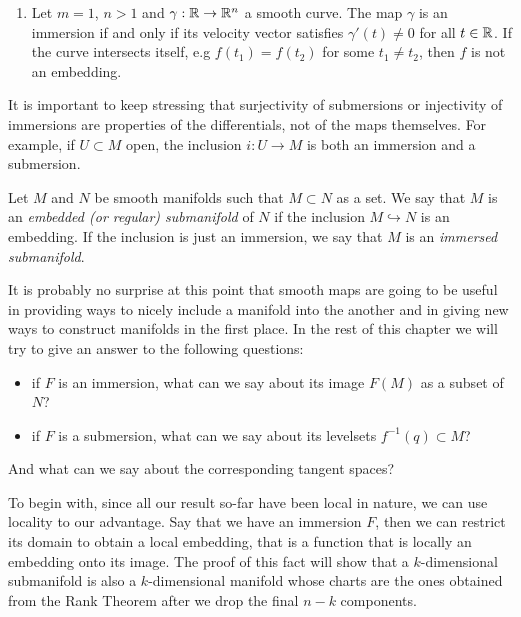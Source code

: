 \begin{example}
\begin{enumerate}
    \item Let $m=1$, $n > 1$ and $\gamma:\mathbb{R}\to\mathbb{R}^n$ a smooth curve.
          The map $\gamma$ is an immersion if and only if its velocity vector satisfies $\gamma'(t)\neq0$ for all $t\in\mathbb{R}$.
          If the curve intersects itself, e.g $f(t_1) = f(t_2)$ for some $t_1\neq t_2$, then $f$ is not an embedding.
  \end{enumerate}
\end{example}

\begin{remark}
  It is important to keep stressing that surjectivity of submersions or injectivity of immersions are properties of the differentials, not of the maps themselves.
  For example, if $U\subset M$ open, the inclusion $i: U \to M$ is both an immersion and a submersion.
\end{remark}

\begin{definition}
  Let $M$ and $N$ be smooth manifolds such that $M\subset N$ as a set.
  We say that $M$ is an \emph{embedded (or regular) submanifold} of $N$ if the inclusion $M\hookrightarrow N$ is an embedding. If the inclusion is just an immersion, we say that $M$ is an \emph{immersed submanifold}.
\end{definition}

It is probably no surprise at this point that smooth maps are going to be useful in providing ways to nicely include a manifold into the another and in giving new ways to construct manifolds in the first place.
In the rest of this chapter we will try to give an answer to the following questions:
\begin{itemize}
  \item if $F$ is an immersion, what can we say about its image $F(M)$ as a subset of $N$?
  \item if $F$ is a submersion, what can we say about its levelsets $f^{-1}(q) \subset M$?
\end{itemize}
And what can we say about the corresponding tangent spaces?


To begin with, since all our result so-far have been local in nature, we can use locality to our advantage.
Say that we have an immersion $F$, then we can restrict its domain to obtain a local embedding, that is
a function that is locally an embedding onto its image.
The proof of this fact will show that a $k$-dimensional submanifold is also a $k$-dimensional manifold
whose charts are the ones obtained from the Rank Theorem after we drop the final $n-k$ components.

